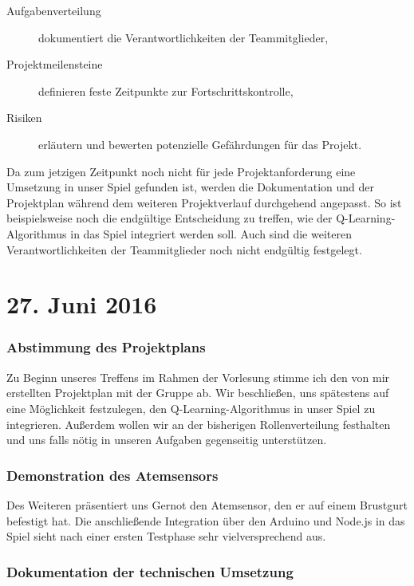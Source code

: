 \documentclass{report}
\begin{document}
\begin{description}
	\item [Aufgabenverteilung] dokumentiert die Verantwortlichkeiten der Teammitglieder,
	\item [Projektmeilensteine] definieren feste Zeitpunkte zur Fortschrittskontrolle,
	\item [Risiken] erläutern und bewerten potenzielle Gefährdungen für das Projekt.
\end{description}

\noindent Da zum jetzigen Zeitpunkt noch nicht für jede Projektanforderung eine Umsetzung in unser Spiel gefunden ist, werden die Dokumentation und der Projektplan während dem weiteren Projektverlauf durchgehend angepasst. So ist beispielsweise noch die endgültige Entscheidung zu treffen, wie der Q-Learning-Algorithmus in das Spiel integriert werden soll. Auch sind  die weiteren Verantwortlichkeiten der Teammitglieder noch nicht endgültig festgelegt.


\section*{27. Juni 2016}

\subsubsection*{Abstimmung des Projektplans}

Zu Beginn unseres Treffens im Rahmen der Vorlesung stimme ich den von mir erstellten Projektplan mit der Gruppe ab. Wir beschließen, uns spätestens auf eine Möglichkeit festzulegen, den Q-Learning-Algorithmus in unser Spiel zu integrieren. Außerdem wollen wir an der bisherigen Rollenverteilung festhalten und uns falls nötig in unseren Aufgaben gegenseitig unterstützen.


\subsubsection*{Demonstration des Atemsensors}

Des Weiteren präsentiert uns Gernot den Atemsensor, den er auf einem Brustgurt befestigt hat. Die anschließende Integration über den Arduino und Node.js in das Spiel sieht nach einer ersten Testphase sehr vielversprechend aus. 


\subsubsection*{Dokumentation der technischen Umsetzung}
\end{document}
